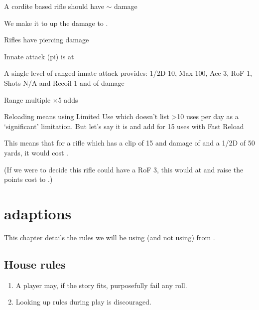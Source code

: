 \begin{innateattack}
  \item A cordite based rifle should have \(\sim\) damage
  \item We make it  to up the damage to .
  \item Rifles have piercing damage
  \item Innate attack (pi) is at 
  \item A single level of ranged innate attack provides: 1/2D 10, Max 100, Acc
    3, RoF 1, Shots N/A and Recoil 1 and  of damage
  \item Range multiple ×5 adds 
  \item Reloading means using Limited Use which doesn't list >10 uses per day as
    a `significant' limitation. But let's say it is and add
    for 15 uses with Fast Reload
  \item This means that for a rifle which has a clip of 15 and damage of
     and a 1/2D of 50 yards, it would cost
    \InnateAttackTotalPoints.
  \item (If we were to decide this rifle could have a RoF 3, this would at
     and raise the points cost to
    \InnateAttackTotalPoints.)
\end{innateattack}

\begin{center}
  \InnateAttackBreakdown
\end{center}
\chapter{\gurps adaptions}
\label{cha:gurps-adaptions}

This chapter details the rules we will be using (and not using) from \gurps.

\section{House rules}
\label{sec:house-rules}

\begin{enumerate}
\item A player may, if the story fits, purposefully fail any roll.
\item Looking up rules during play is discouraged.
\end{enumerate}

